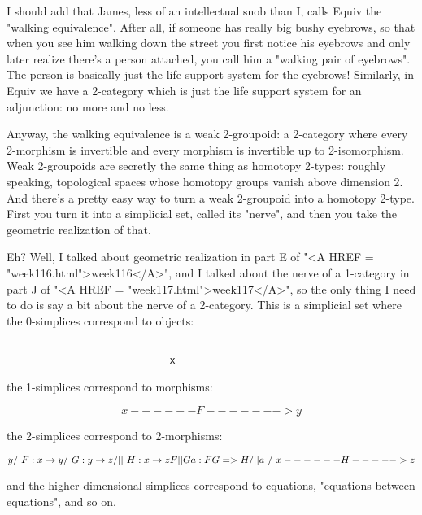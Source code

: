 I should add that James, less of an intellectual snob than I, calls
Equiv the "walking equivalence".  After all, if someone has
really big bushy eyebrows, so that when you see him walking down the
street you first notice his eyebrows and only later realize there's a
person attached, you call him a "walking pair of eyebrows".
The person is basically just the life support system for the eyebrows!
Similarly, in Equiv we have a 2-category which is just the life support
system for an adjunction: no more and no less.

Anyway, the walking equivalence is a weak 2-groupoid: a 2-category where
every 2-morphism is invertible and every morphism is invertible up to
2-isomorphism.  Weak 2-groupoids are secretly the same thing as homotopy
2-types: roughly speaking, topological spaces whose homotopy groups
vanish above dimension 2.  And there's a pretty easy way to turn a weak
2-groupoid into a homotopy 2-type.  First you turn it into a simplicial
set, called its "nerve", and then you take the geometric
realization of that.

Eh?  Well, I talked about geometric realization in part E of "<A
HREF = "week116.html">week116</A>", and I talked about the nerve of
a 1-category in part J of "<A HREF =
"week117.html">week117</A>", so the only thing I need to do is say
a bit about the nerve of a 2-category.  This is a simplicial set where
the 0-simplices correspond to objects:



\begin{verbatim}

                            x
\end{verbatim}
    
the 1-simplices correspond to morphisms:



$$

                    x ------F-------> y
$$
    
the 2-simplices correspond to 2-morphisms:


$$

                            y
                           / \                F: x \to  y 
                          /   \               G: y \to  z
                         / ||  \              H: x \to  z
                        F  ||   G             a: FG => H
                       /   ||a   \
                      /    \/     \
                     x------H----->z
$$
    
and the higher-dimensional simplices correspond to equations, "equations
between equations", and so on.  


